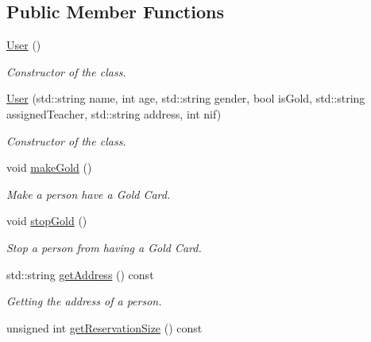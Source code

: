 \subsection*{Public Member Functions}
\begin{DoxyCompactItemize}
\item 
\mbox{\label{class_user_a4a0137053e591fbb79d9057dd7d2283d}} 
\mbox{\hyperlink{class_user_a4a0137053e591fbb79d9057dd7d2283d}{User}} ()
\begin{DoxyCompactList}\small\item\em Constructor of the class. \end{DoxyCompactList}\item 
\mbox{\hyperlink{class_user_afb81317eadcdbe867c09baea47e31e96}{User}} (std\+::string name, int age, std\+::string gender, bool is\+Gold, std\+::string assigned\+Teacher, std\+::string address, int nif)
\begin{DoxyCompactList}\small\item\em Constructor of the class. \end{DoxyCompactList}\item 
\mbox{\label{class_user_a1ddb4cbabc84ef92ac92bfe6f9385d39}} 
void \mbox{\hyperlink{class_user_a1ddb4cbabc84ef92ac92bfe6f9385d39}{make\+Gold}} ()
\begin{DoxyCompactList}\small\item\em Make a person have a Gold Card. \end{DoxyCompactList}\item 
\mbox{\label{class_user_a88a8b41f134b21aeb702c481ffee0ef4}} 
void \mbox{\hyperlink{class_user_a88a8b41f134b21aeb702c481ffee0ef4}{stop\+Gold}} ()
\begin{DoxyCompactList}\small\item\em Stop a person from having a Gold Card. \end{DoxyCompactList}\item 
std\+::string \mbox{\hyperlink{class_user_aef1759300db1bca3c84af6af79f00365}{get\+Address}} () const
\begin{DoxyCompactList}\small\item\em Getting the address of a person. \end{DoxyCompactList}\item 
unsigned int \mbox{\hyperlink{class_user_ad87b45e028489ed785fa82a4c9fc6739}{get\+Reservation\+Size}} () const

\end{DoxyCompactItemize}
